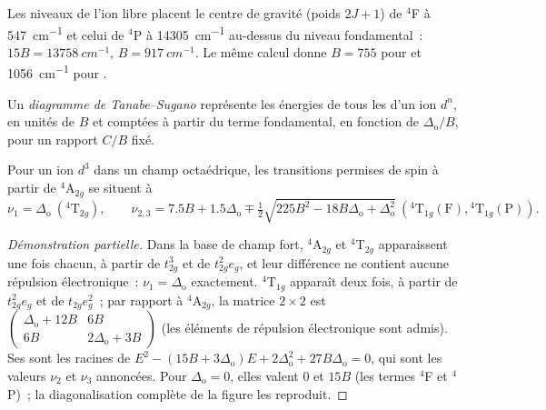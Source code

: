 \begin{example}\label{ex:b3:complex-spectra-magnetism:free-B}
Les niveaux de l'ion libre  placent le centre de gravité (poids
$2J + 1$) de $^4$F à \qty{547}{cm^{-1}} et celui de $^4$P à
\qty{14305}{cm^{-1}} au-dessus du niveau fondamental~: $15B = \qty{13758}{cm^{-1}}$,
$B = \qty{917}{cm^{-1}}$. Le même calcul donne $B = 755$ pour  et
\qty{1056}{cm^{-1}} pour .
\end{example}

\begin{definition}\label{def:b3:complex-spectra-magnetism:tanabe-sugano}
Un \emph{diagramme de Tanabe--Sugano} représente les
énergies de tous les  d'un ion $d^n$, en unités
de $B$ et comptées à partir du terme fondamental, en fonction de
$\Delta_{\mathrm o}/B$, pour un rapport $C/B$ fixé.
\end{definition}

\begin{proposition}\label{prop:b3:complex-spectra-magnetism:d3-bands}
Pour un ion $d^3$ dans un champ octaédrique, les transitions permises de spin
à partir de $^4$A$_{2g}$ se situent à
\[
  \nu_1 = \Delta_{\mathrm o}\ (^4\mathrm T_{2g}), \qquad
  \nu_{2,3} = 7.5B + 1.5\Delta_{\mathrm o} \mp \tfrac12\sqrt{225B^2 - 18B\Delta_{\mathrm o} + \Delta_{\mathrm o}^2}\ (^4\mathrm T_{1g}(\mathrm F), {}^4\mathrm T_{1g}(\mathrm P)).
\]
\end{proposition}

\begin{proof}[Démonstration partielle]
Dans la base de champ fort, $^4$A$_{2g}$ et $^4$T$_{2g}$ apparaissent une
fois chacun, à partir de $t_{2g}^3$ et de $t_{2g}^2e_g$, et leur différence ne
contient aucune répulsion électronique~: $\nu_1 = \Delta_{\mathrm o}$ exactement.
$^4$T$_{1g}$ apparaît deux fois, à partir de $t_{2g}^2e_g$ et de $t_{2g}e_g^2$~;
par rapport à $^4$A$_{2g}$, la matrice $2\times2$ est
$\begin{pmatrix}\Delta_{\mathrm o} + 12B & 6B\\ 6B & 2\Delta_{\mathrm o} + 3B\end{pmatrix}$ (les éléments de répulsion électronique sont admis).
Ses  sont les racines de $E^2 - (15B + 3\Delta_{\mathrm o})E + 2\Delta_{\mathrm o}^2 + 27B\Delta_{\mathrm o} = 0$,
qui sont les valeurs $\nu_2$ et $\nu_3$ annoncées. Pour $\Delta_{\mathrm o} = 0$,
elles valent 0 et $15B$ (les termes $^4$F et $^4$P)~; la diagonalisation
complète de la figure les reproduit.
\end{proof}

